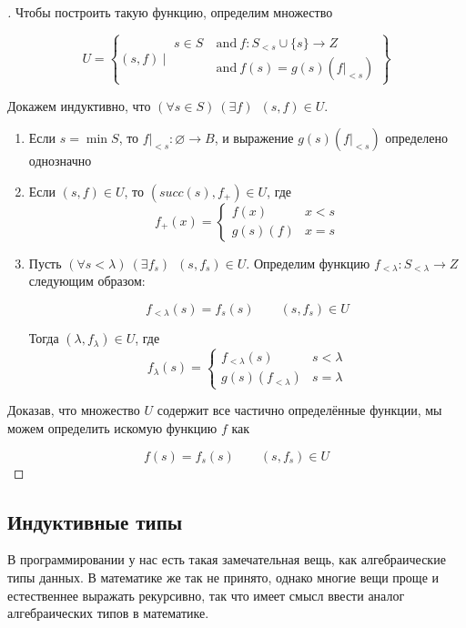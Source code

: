 \documentclass[10pt, a4paper]{article}
\theoremstyle{colon}
\begin{document}
\begin{proof}[\unskip\indent\nopunct]
Чтобы построить такую функцию, определим множество

\[
U = \left\{(s, f) {\ \Bigg|\ }
\begin{aligned}
  s \in S \ &\mathrm{and}\ f : S_{<s} \cup \{s\} \to Z \\
  &\mathrm{and}\ f(s) = g(s)(f|_{< s})
\end{aligned}\right\}
\]

Докажем индуктивно, что \( (\forall s \in S)\ (\exists f)\enspace (s, f) \in U \).

\begin{enumerate}
\item Если \( s = \operatorname{min} S \), то \( f|_{< s} : \varnothing \to B \),
и выражение \( g(s)(f|_{< s}) \) определено однозначно

\item Если \( (s, f) \in U \), то \( (succ(s), f_+) \in U \), где
\[
f_+(x) = \begin{cases}
f(x) &x < s \\
g(s)(f) &x = s
\end{cases}
\]

\item Пусть \( (\forall s < \lambda)\ (\exists f_s)\enspace (s, f_s) \in U \).
Определим функцию \( f_{<\lambda} : S_{<\lambda} \to Z \) следующим образом:

\[
f_{<\lambda}(s) = f_s(s) \qquad (s, f_s) \in U
\]

Тогда \( (\lambda, f_\lambda) \in U \), где
\[
f_\lambda(s) = \begin{cases}
f_{<\lambda}(s) &s < \lambda  \\
g(s)(f_{<\lambda}) &s = \lambda
\end{cases}
\]
\end{enumerate}

Доказав, что множество \( U \) содержит все частично определённые функции,
мы можем определить искомую функцию \( f \) как

\[
f(s) = f_s(s) \qquad (s, f_s) \in U
\]
\end{proof}

\subsection{Индуктивные типы}

В программировании у нас есть такая замечательная вещь, как алгебраические типы данных. В математике
же так не принято, однако многие вещи проще и естественнее выражать рекурсивно, так что имеет смысл
ввести аналог алгебраических типов в математике.
\end{document}
